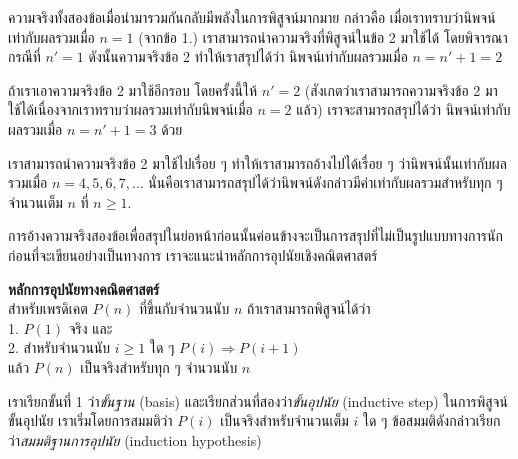 ความจริง{\wbr}ทั้ง{\wbr}สอง{\wbr}ข้อ{\wbr}เมื่อ{\wbr}นำมา{\wbr}รวม{\wbr}กัน{\wbr}กลับ{\wbr}มี{\wbr}พลัง{\wbr}ใน{\wbr}การ{\wbr}พิสูจน์{\wbr}มากมาย กล่าวคือ{\wbr}
เมื่อ{\wbr}เรา{\wbr}ทราบ{\wbr}ว่า{\wbr}นิพจน์{\wbr}เท่า{\wbr}กับ{\wbr}ผลรวม{\wbr}เมื่อ $ n=1 $ (จาก{\wbr}ข้อ 1.)
เรา{\wbr}สามารถ{\wbr}นำ{\wbr}ความจริง{\wbr}ที่{\wbr}พิสูจน์{\wbr}ใน{\wbr}ข้อ 2 มา{\wbr}ใช้ได้ โดย{\wbr}พิจารณา{\wbr}กรณี{\wbr}ที่ $ n'=1 $
ดังนั้น{\wbr}ความจริง{\wbr}ข้อ 2 ทำ{\wbr}ให้{\wbr}เรา{\wbr}สรุป{\wbr}ได้{\wbr}ว่า นิพจน์{\wbr}เท่า{\wbr}กับ{\wbr}ผลรวม{\wbr}เมื่อ $ n=n'+1=2 $

ถ้า{\wbr}เรา{\wbr}เอา{\wbr}ความจริง{\wbr}ข้อ 2 มา{\wbr}ใช้{\wbr}อีก{\wbr}รอบ โดย{\wbr}ครั้งนี้{\wbr}ให้ $ n'=2 $
(สังเกต{\wbr}ว่า{\wbr}เรา{\wbr}สามารถ{\wbr}ความจริง{\wbr}ข้อ 2 มา{\wbr}ใช้ได้{\wbr}เนื่องจาก{\wbr}เรา{\wbr}ทราบ{\wbr}ว่า{\wbr}ผลรวม{\wbr}เท่า{\wbr}กับ{\wbr}นิพจน์{\wbr}เมื่อ $
n=2 $ แล้ว) เรา{\wbr}จะ{\wbr}สามารถ{\wbr}สรุป{\wbr}ได้{\wbr}ว่า นิพจน์{\wbr}เท่า{\wbr}กับ{\wbr}ผลรวม{\wbr}เมื่อ $ n=n'+1=3 $ ด้วย{\wbr}

เรา{\wbr}สามารถ{\wbr}นำ{\wbr}ความจริง{\wbr}ข้อ 2 มา{\wbr}ใช้{\wbr}ไป{\wbr}เรื่อย ๆ ทำ{\wbr}ให้{\wbr}เรา{\wbr}สามารถ{\wbr}อ้าง{\wbr}ไป{\wbr}ได้{\wbr}เรื่อย ๆ
ว่า{\wbr}นิพจน์{\wbr}นั้น{\wbr}เท่า{\wbr}กับ{\wbr}ผลรวม{\wbr}เมื่อ $ n=4,5,6,7,\ldots $
นั่น{\wbr}คือ{\wbr}เรา{\wbr}สามารถ{\wbr}สรุป{\wbr}ได้{\wbr}ว่า{\wbr}นิพจน์{\wbr}ดังกล่าว{\wbr}มี{\wbr}ค่า{\wbr}เท่า{\wbr}กับ{\wbr}ผลรวม{\wbr}สำหรับ{\wbr}ทุก ๆ จำนวนเต็ม $ n $ ที่{\wbr}
$ n\geq 1 $.

การ{\wbr}อ้าง{\wbr}ความจริง{\wbr}สอง{\wbr}ข้อ{\wbr}เพื่อ{\wbr}สรุป{\wbr}ใน{\wbr}ย่อหน้า{\wbr}ก่อน{\wbr}นั้น{\wbr}ค่อนข้าง{\wbr}จะ{\wbr}เป็น{\wbr}การ{\wbr}สรุป{\wbr}ที่{\wbr}ไม่{\wbr}เป็น{\wbr}รูปแบบ{\wbr}ทางการ{\wbr}นัก ก่อน{\wbr}ที่{\wbr}จะ{\wbr}เขียน{\wbr}อย่าง{\wbr}เป็นทางการ เรา{\wbr}จะ{\wbr}แนะนำ{\wbr}หลักการ{\wbr}อุปนัย{\wbr}เชิง{\wbr}คณิตศาสตร์{\wbr}

\framed\noindent
{\bf หลักการ{\wbr}อุปนัย{\wbr}ทาง{\wbr}คณิตศาสตร์}\\
สำหรับ{\wbr}เพรดิเคต $P(n)$ ที่{\wbr}ขึ้น{\wbr}กับ{\wbr}จำนวนนับ $n$ ถ้า{\wbr}เรา{\wbr}สามารถ{\wbr}พิสูจน์{\wbr}ได้{\wbr}ว่า\\
1. $P(1)$ จริง และ\\
2. สำหรับ{\wbr}จำนวนนับ $i\geq 1$ ใด ๆ $P(i)\Rightarrow P(i+1)$\\
แล้ว $P(n)$ เป็นจริง{\wbr}สำหรับ{\wbr}ทุก ๆ จำนวนนับ $n$
\endframed

เรา{\wbr}เรียก{\wbr}ขั้น{\wbr}ที่ 1 ว่า{\em ขั้น{\wbr}ฐาน} (basis) และ{\wbr}เรียก{\wbr}ส่วน{\wbr}ที่{\wbr}สอง{\wbr}ว่า{\em ขั้น{\wbr}อุปนัย}
(inductive step) ใน{\wbr}การ{\wbr}พิสูจน์{\wbr}ขั้น{\wbr}อุปนัย เรา{\wbr}เริ่ม{\wbr}โดย{\wbr}การ{\wbr}สมมติ{\wbr}ว่า $ P(i) $
เป็นจริง{\wbr}สำหรับ{\wbr}จำนวนเต็ม $ i $ ใด ๆ ข้อสมมติ{\wbr}ดังกล่าว{\wbr}เรียก{\wbr}ว่า{\em สมมติฐาน{\wbr}การ{\wbr}อุปนัย}
(induction hypothesis)

